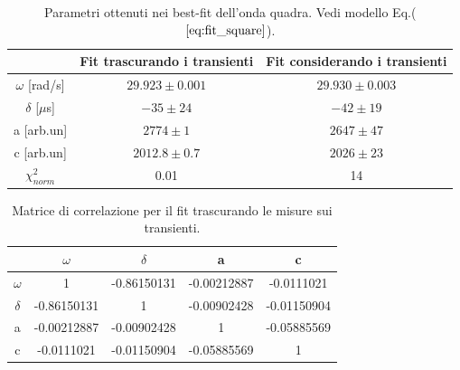 \documentclass{article}
\begin{document}
            \begin{table}
                \centering
                \begin{tabular}{ccc}
                    \hline
                     & Fit trascurando i transienti & Fit considerando i transienti \\
                    \hline
                    $\omega$ [rad/s]        & $29.923 \pm 0.001$    & $29.930\pm 0.003$ \\
                    $\delta$ [$\mu$s]       & $-35\pm 24$           & $-42\pm 19$ \\
                    a [arb.un]              & $2774 \pm 1$          & $2647 \pm 47$ \\
                    c [arb.un]              & $2012.8 \pm 0.7$      & $2026 \pm 23$ \\
                    $\chi^{2}_{norm}$ & 0.01 & 14 \\
                    \hline
                \end{tabular}
                \caption{Parametri ottenuti nei best-fit dell'onda quadra. 
                Vedi modello Eq.($\ref{eq:fit_square}$).}
                \label{tab:bestfit_square}
            \end{table}



            \begin{table}
                \centering
                \begin{tabular}{ccccc}
                    \hline
                    & $\omega$ & $\delta$ & a & c \\
                    \hline
                    $\omega$ & 1 & -0.86150131 & -0.00212887 & -0.0111021 \\
                    $\delta$ & -0.86150131 & 1 & -0.00902428 & -0.01150904 \\
                    a & -0.00212887 & -0.00902428 & 1 & -0.05885569 \\
                    c & -0.0111021 & -0.01150904 & -0.05885569 & 1 \\
                    \hline
                \end{tabular}
                \caption{Matrice di correlazione per il fit trascurando le misure sui transienti.}
                \label{tab:corr_matrix_no_transients}
            \end{table}
\end{document}
